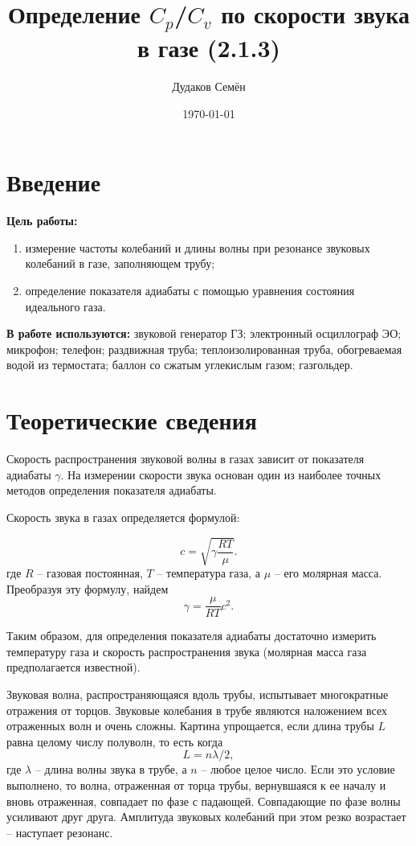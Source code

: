 \documentclass[a4paper,12pt]{article}
\title{Определение $C_p$/$C_v$ по скорости звука в газе (2.1.3)}
\author{Дудаков Семён}
\date{\today}
\theoremstyle{definition}
\begin{document}
	\maketitle
	
	\section{Введение}
	\noindent\textbf{Цель работы:}  
	\begin{enumerate}
		\item измерение частоты колебаний и длины волны при резонансе звуковых колебаний в газе, заполняющем трубу;
		\item определение показателя адиабаты с помощью уравнения состояния идеального газа.
	\end{enumerate}
	
	\textbf{В работе используются:} звуковой генератор ГЗ; электронный осциллограф ЭО; микрофон; телефон; раздвижная труба; теплоизолированная труба, обогреваемая водой из термостата; баллон со сжатым углекислым газом; газгольдер.
	
	\section{Теоретические сведения}
	
	Скорость распространения звуковой волны в газах зависит от показателя адиабаты $\gamma $. На измерении скорости звука основан один из наиболее точных методов определения показателя адиабаты.
	
	Скорость звука в газах определяется формулой:
	
	\begin{equation}
		c=\sqrt{\gamma\frac{RT}{\mu}}.
		\label{velocity}
	\end{equation}
	где $ R $ -- газовая постоянная, $ T $ -- температура газа, а $ \mu $ -- его молярная масса. Преобразуя эту формулу, найдем
	\begin{equation}\label{gamma}
		\boxed{\gamma = \frac{\mu}{RT}c^2}.
	\end{equation}
	
	Таким образом, для определения показателя адиабаты достаточно измерить температуру газа и скорость распространения звука (молярная масса газа предполагается известной).
	
	Звуковая волна, распространяющаяся вдоль трубы, испытывает многократные отражения от торцов. Звуковые колебания в трубе являются наложением всех отраженных волн и очень сложны. Картина упрощается, если длина трубы $ L $ равна целому числу полуволн, то есть когда \[ L=n\lambda/2, \] где $ \lambda $ -- длина волны звука в трубе, а $ n $ -- любое целое число. Если это условие выполнено, то волна, отраженная от торца трубы, вернувшаяся к ее началу и вновь отраженная, совпадает по фазе с падающей. Совпадающие по фазе волны усиливают друг друга. Амплитуда звуковых колебаний при этом резко возрастает -- наступает резонанс.
	
\end{document}
